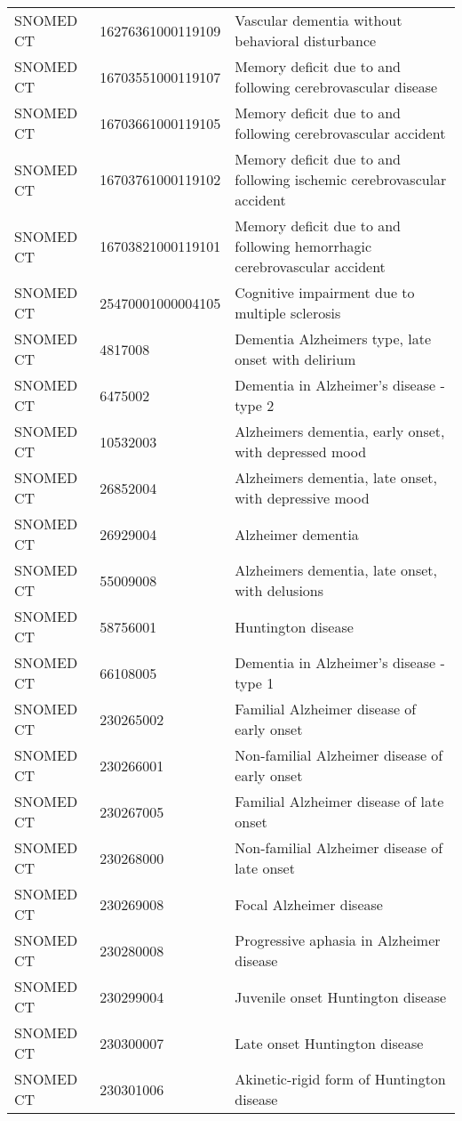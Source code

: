 \begin{longtable}{p{}p{}p{}}
  SNOMED CT & 16276361000119109 & Vascular dementia without behavioral disturbance \\ 
  SNOMED CT & 16703551000119107 & Memory deficit due to and following cerebrovascular disease \\ 
  SNOMED CT & 16703661000119105 & Memory deficit due to and following cerebrovascular accident \\ 
  SNOMED CT & 16703761000119102 & Memory deficit due to and following ischemic cerebrovascular accident \\ 
  SNOMED CT & 16703821000119101 & Memory deficit due to and following hemorrhagic cerebrovascular accident \\ 
  SNOMED CT & 25470001000004105 & Cognitive impairment due to multiple sclerosis \\ 
  SNOMED CT & 4817008 & Dementia Alzheimers type, late onset with delirium \\ 
  SNOMED CT & 6475002 & Dementia in Alzheimer's disease - type 2 \\ 
  SNOMED CT & 10532003 & Alzheimers dementia, early onset, with depressed mood \\ 
  SNOMED CT & 26852004 & Alzheimers dementia, late onset, with depressive mood \\ 
  SNOMED CT & 26929004 & Alzheimer dementia \\ 
  SNOMED CT & 55009008 & Alzheimers dementia, late onset, with delusions \\ 
  SNOMED CT & 58756001 & Huntington disease \\ 
  SNOMED CT & 66108005 & Dementia in Alzheimer's disease - type 1 \\ 
  SNOMED CT & 230265002 & Familial Alzheimer disease of early onset \\ 
  SNOMED CT & 230266001 & Non-familial Alzheimer disease of early onset \\ 
  SNOMED CT & 230267005 & Familial Alzheimer disease of late onset \\ 
  SNOMED CT & 230268000 & Non-familial Alzheimer disease of late onset \\ 
  SNOMED CT & 230269008 & Focal Alzheimer disease \\ 
  SNOMED CT & 230280008 & Progressive aphasia in Alzheimer disease \\ 
  SNOMED CT & 230299004 & Juvenile onset Huntington disease \\ 
  SNOMED CT & 230300007 & Late onset Huntington disease \\ 
  SNOMED CT & 230301006 & Akinetic-rigid form of Huntington disease \\ 

\end{longtable}
